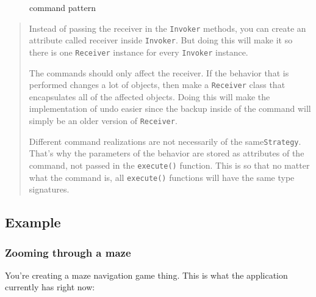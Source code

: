 \begin{figure}
\centering
{}
\caption{command pattern}
\end{figure}

\begin{quote}
Instead of passing the receiver in the \texttt{Invoker} methods, you can
create an attribute called receiver inside \texttt{Invoker}. But doing
this will make it so there is one \texttt{Receiver} instance for every
\texttt{Invoker} instance.

The commands should only affect the receiver. If the behavior that is
performed changes a lot of objects, then make a \texttt{Receiver} class
that encapsulates all of the affected objects. Doing this will make the
implementation of undo easier since the backup inside of the command
will simply be an older version of \texttt{Receiver}.

Different command realizations are not necessarily of the
same\texttt{Strategy}. That's why the parameters of the behavior are
stored as attributes of the command, not passed in the
\texttt{execute()} function. This is so that no matter what the command
is, all \texttt{execute()} functions will have the same type signatures.
\end{quote}

\subsection{Example}\label{behavioral-patterns.md__example-2}

\subsubsection{Zooming through a
maze}\label{behavioral-patterns.md__zooming-through-a-maze}

You're creating a maze navigation game thing. This is what the
application currently has right now:

